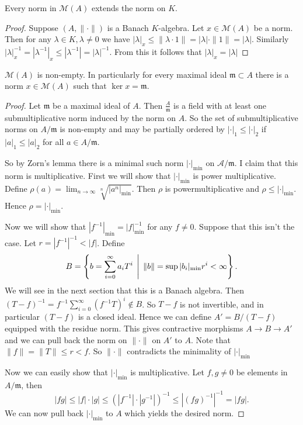 \begin{proposition}\label{prop:norm_spectrum_extends_base_field}
	Every norm in $\mathcal{M} (A)$ extends the norm on $K$. 
\end{proposition}
\begin{proof}
	Suppose $(A, \|\cdot \|)$ is a Banach $K$-algebra. 
	Let $x \in \mathcal{M} (A)$ be a norm. 
	Then for any $\lambda \in K, \lambda \ne 0$ we have $|\lambda|_x \le  \|\lambda\cdot 1\| = |\lambda| \cdot \|1\| = |\lambda|$. 
	Similarly $|\lambda|_x^{-1} = |\lambda^{-1}|_x  \le |\lambda^{-1}| = |\lambda|^{-1}$. 
	From this it follows that $|\lambda|_x = |\lambda|$
\end{proof}


\begin{proposition}
	$\mathcal{M} (A)$ is non-empty. 
	In particularly for every maximal ideal $\mathfrak{m}  \subset  A$ there is a norm $x \in \mathcal{M} (A)$ such that $\ker x = \mathfrak{m} $.
\end{proposition}
\begin{proof}
	Let $\mathfrak{m}$ be a maximal ideal of $A$. 
	Then $\frac{A}{\mathfrak{m} }$ is a field  with at least one submultiplicative norm induced by the norm on  $A$. 
	So the set of submultiplicative norms on  $A/\mathfrak{m} $ is non-empty and may be partially ordered by $|\cdot |_1 \le |\cdot |_2$ if $|a|_1 \le |a|_2$ for all $a \in A / \mathfrak{m} $. 

	So by Zorn's lemma there is a minimal such norm $|\cdot |_\text{min} $ on $\mathcal{A}  / \mathfrak{m} $. 
	I claim that this norm is multiplicative. 
	First we will show that $|\cdot |_\text{min} $ is power multiplicative. 
	Define $\rho(a) = \lim_{n \to \infty} \sqrt[n]{|a^{n}|_\text{min} } $. Then $\rho$ is powermultiplicative and $\rho \le |\cdot |_\text{min} $. Hence $\rho = |\cdot |_\text{min} $. 

	Now we will show that $|f^{-1}|_\text{min}  = |f|^{-1}_\text{min} $ for any $f \ne 0$. 
	Suppose that this isn't the case. Let  $r = |f^{-1}|^{-1} < |f|$. 
	Define \[
	B = \left\{b = \sum_{i = 0}^{\infty} a_i T^{i}\st \|b\|  =\sup |b_i|_\text{min}  r^{i} < \infty\right\} 
	.\] 
	We will see in the next section that this is a Banach algebra. Then $(T - f)^{-1} = f^{-1}\sum_{i = 0}^{\infty} (f^{-1} T)^{i} \not\in B $. So $T - f$ is not invertible, and in particular $(T - f)$ is a closed ideal. 
	Hence we can define $A' = B / (T - f)$ equipped with the residue norm. 
	This gives contractive morphisms  $A \to B \to A'$ and we can pull back the norm on $\|\cdot \|$ on $A'$ to $A$. 
	Note that $\|f\| = \|T\|  \le  r < f$. So $\|\cdot \|$ contradicts the minimality of $|\cdot |_\text{min} $

	Now we can easily show that $|\cdot |_\text{min} $ is multiplicative. 
	Let $f, g \ne 0$ be elements in $A / \mathfrak{m} $, then \[
		|fg| \le |f|\cdot |g| \le (|f^{-1}| \cdot |g^{-1}|)^{-1} \le |(fg)^{-1}|^{-1} = |fg|. 
	\]
	We can now pull back $|\cdot |_\text{min} $ to $A$ which yields the desired norm. 
\end{proof}

